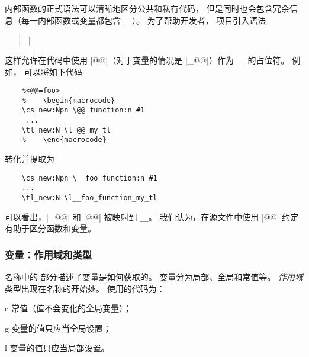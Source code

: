 \documentclass{l3doc}
\newenvironment{arg-description}{%
\begin{itemize}\def\makelabel##1{\hss\llap{\bfseries##1}}}{\end{itemize}}
\begin{document}
内部函数的正式语法可以清晰地区分公共和私有代码，
但是同时也会包含冗余信息（每一内部函数或变量都包含 \texttt{__}）。
为了帮助开发者， 项目引入语法
\begin{quote}
\ttfamily
|%
\end{quote}
这样允许在代码中使用 |@@|（对于变量的情况是 |_@@|）作为 \texttt{__} 的占位符。
例如， 可以将如下代码
\begin{verbatim}
    %<@@=foo>
    %    \begin{macrocode}
    \cs_new:Npn \@@_function:n #1
     ...
    \tl_new:N \l_@@_my_tl
    %    \end{macrocode}
\end{verbatim}
转化并提取为
\begin{verbatim}
    \cs_new:Npn \__foo_function:n #1
    ...
    \tl_new:N \l__foo_function_my_tl
\end{verbatim}
可以看出，|_@@| 和 |@@| 被映射到 \texttt{__}。
我们认为，在源文件中使用 |@@| 约定有助于区分函数和变量。

%
\subsubsection{变量：作用域和类型}

%
%

名称中的  部分描述了变量是如何获取的。
变量分为局部、全局和常值等。
\emph{作用域}类型出现在名称的开始处。
使用的代码为：
\begin{arg-description}
    \item[c] 常值（值不会变化的全局变量）；
    \item[g] 变量的值只应当全局设置；
    \item[l] 变量的值只应当局部设置。
\end{arg-description}
\end{document}

